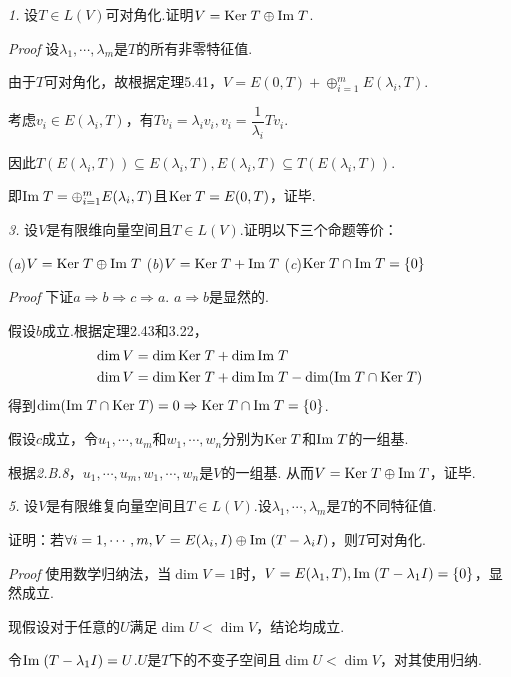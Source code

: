 \textit{1.}
设\(T \in L(V)\)可对角化.证明\(V=\mathrm{Ker \;} T \oplus \mathrm{Im \;} T\).

\textit{Proof}
设\(\lambda_1,\cdots,\lambda_m\)是\(T\)的所有非零特征值.

由于\(T\)可对角化，故根据定理5.41，\(V=E(0,T)+\oplus_{i=1}^m E(\lambda_i,T)\).

考虑\(v_i \in E(\lambda_i,T)\)，有\(Tv_i=\lambda_iv_i,v_i=\dfrac{1}{\lambda_i}Tv_i\).

因此\(T(E(\lambda_i,T)) \subseteq E(\lambda_i,T),E(\lambda_i,T) \subseteq T(E(\lambda_i,T))\).

即\(\mathrm{Im \;} T=\oplus_{i=1}^m E(\lambda_i,T)\)且\(\mathrm{Ker \;} T=E(0,T)\)，证毕.

\hspace*{\fill}

\textit{3.}
设\(V\)是有限维向量空间且\(T \in L(V)\).证明以下三个命题等价：

(\textit{a})\(V=\mathrm{Ker \;} T \oplus \mathrm{Im \;} T\) \quad
(\textit{b})\(V=\mathrm{Ker \;} T+\mathrm{Im \;} T\) \quad
(\textit{c})\(\mathrm{Ker \;} T \cap \mathrm{Im \;} T=\{0\}\)

\textit{Proof}
下证\(a \Rightarrow b \Rightarrow c \Rightarrow a\).
\(a \Rightarrow b\)是显然的.

假设\(b\)成立.根据定理2.43和3.22，
    \begin{align*}
        \dim V &= \dim \mathrm{Ker \;} T+\dim \mathrm{Im \;} T \\
        \dim V &= \dim \mathrm{Ker \;} T+\dim \mathrm{Im \;} T-\dim (\mathrm{Im \;} T \cap \mathrm{Ker \;} T)
    \end{align*}
得到\(\dim (\mathrm{Im \;} T \cap \mathrm{Ker \;} T)=0 \Rightarrow \mathrm{Ker \;} T \cap \mathrm{Im \;} T=\{0\}\).

假设\(c\)成立，令\(u_1,\cdots,u_m\)和\(w_1,\cdots,w_n\)分别为\(\mathrm{Ker \;} T\)和\(\mathrm{Im \;} T\)的一组基.

根据\textit{2.B.8}，\(u_1,\cdots,u_m,w_1,\cdots,w_n\)是\(V\)的一组基.
从而\(V=\mathrm{Ker \;} T \oplus \mathrm{Im \;} T\)，证毕.

\hspace*{\fill}

\textit{5.}
设\(V\)是有限维复向量空间且\(T \in L(V)\).设\(\lambda_1,\cdots,\lambda_m\)是\(T\)的不同特征值.

证明：若\(\forall i=1,\cdots,m,V=E(\lambda_i,I) \oplus \mathrm{Im \;}(T-\lambda_i I)\)，则\(T\)可对角化.

\textit{Proof}
使用数学归纳法，当\(\dim V=1\)时，\(V=E(\lambda_1,T),\mathrm{Im \;}(T-\lambda_1 I)=\{0\}\)，显然成立.

现假设对于任意的\(U\)满足\(\dim U<\dim V\)，结论均成立.

令\(\mathrm{Im \;}(T-\lambda_1 I)=U\).\(U\)是\(T\)下的不变子空间且\(\dim U<\dim V\)，对其使用归纳.

